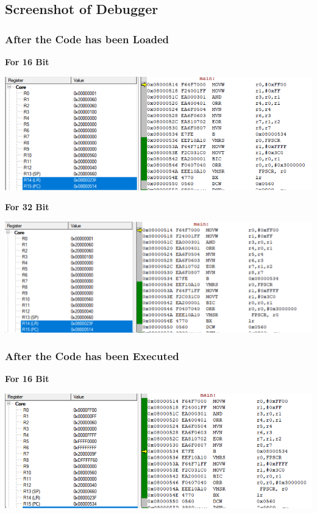 \documentclass{article}
\begin{document}
\subsection{Screenshot of Debugger}


\subsubsection{After the Code has been Loaded}

\textbf{For 16 Bit}\newline\newline
\begin{center}
    \includegraphics[width=1\textwidth]{16Bit_Before.png}
\end{center}

\textbf{For 32 Bit}\newline\newline
\begin{center}
    \includegraphics[width=1\textwidth]{32Bit_Before.png}
\end{center}

\subsubsection{After the Code has been Executed}

\textbf{For 16 Bit}\newline\newline
\begin{center}
    \includegraphics[width=1\textwidth]{16Bit_After.png}
\end{center}\newline\newline
\end{document}
